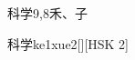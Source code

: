 \begin{entry}{科学}{9,8}{⽲、⼦}
  \begin{phonetics}{科学}{ke1xue2}[][HSK 2]
  \end{phonetics}
\end{entry}
